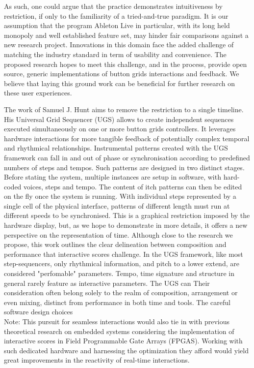 \documentclass[journal,onecolumn]{IEEEtran}
\begin{document}
As such, one could argue that the practice demonstrates intuitiveness by restriction, if only to the familiarity of a tried-and-true paradigm. It is our assumption that the program Ableton Live in particular, with its long held monopoly and well established feature set, may hinder fair comparisons against a new research project. Innovations in this domain face the added challenge of matching the industry standard in term of usability and convenience. The proposed research hopes to meet this challenge, and in the process, provide open source, generic implementations of button grids interactions and feedback. We believe that laying this ground work can be beneficial for further research on these user experiences. 

The work of Samuel J. Hunt\cite{hunt:poly} aims to remove the restriction to a single timeline. His Universal Grid Sequencer (UGS) allows to create independent sequences executed simultaneously on one or more button grids controllers. It leverages hardware interactions for more tangible feedback of potentially complex temporal and rhythmical relationships. Instrumental patterns created with the UGS framework can fall in and out of phase or synchronisation according to predefined numbers of steps and tempos. Such patterns are designed in two distinct stages. Before stating the system, multiple instances are setup in software, with hard-coded voices, steps and tempo. The content of itch patterns can then be edited on the fly once the system is running. With individual steps represented by a single cell of the physical interface, patterns of different length must run at different speeds to be synchronised. This is a graphical restriction imposed by the hardware display, but, as we hope to demonstrate in more details, it offers a new perspective on the representation of time. Although close to the research we propose, this work outlines the clear delineation between composition and performance that interactive scores challenge. In the UGS framework, like most step-sequencers, only rhythmical information, and pitch to a lower extend, are considered "perfomable" parameters. Tempo, time signature and structure in general rarely feature as interactive parameters. The UGS can Their consideration often belong solely to the realm of composition, arrangement or even mixing, distinct from performance in both time and tools.
The careful software design choices \\

Note: This pursuit for seamless interactions would also tie in with previous theoretical research on embedded systems considering the implementation of interactive scores in Field Programmable Gate Arrays (FPGAS)\cite{arias:fpga}. Working with such dedicated hardware and harnessing the optimization they afford would yield great improvements in the reactivity of real-time interactions\cite{popoff:fpga}. 
\end{document}
